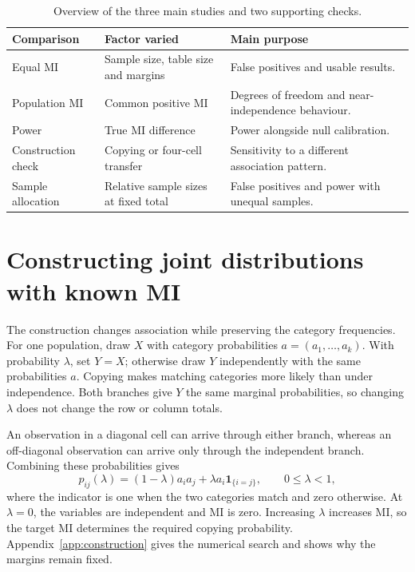 \begin{table}[H]
\centering
\caption{Overview of the three main studies and two supporting checks.}
\label{tab:design-families}
\begin{tabularx}{\textwidth}{@{}l>{\raggedright\arraybackslash}X>{\raggedright\arraybackslash}X@{}}
\toprule
Comparison & Factor varied & Main purpose\\
\midrule
Equal MI & Sample size, table size and margins & False positives and usable results.\\
Population MI & Common positive MI & Degrees of freedom and near-independence behaviour.\\
Power & True MI difference & Power alongside null calibration.\\
\midrule
Construction check & Copying or four-cell transfer & Sensitivity to a different association pattern.\\
Sample allocation & Relative sample sizes at fixed total & False positives and power with unequal samples.\\
\bottomrule
\end{tabularx}
\end{table}

\section{Constructing joint distributions with known MI}

The construction changes association while preserving the category
frequencies. For one population, draw \(X\) with category probabilities
\(a=(a_1,\ldots,a_k)\). With probability \(\lambda\), set \(Y=X\);
otherwise draw \(Y\) independently with the same probabilities \(a\).
Copying makes matching categories more likely than under independence.
Both branches give \(Y\) the same marginal probabilities, so changing
\(\lambda\) does not change the row or column totals.

An observation in a diagonal cell can arrive through either branch,
whereas an off-diagonal observation can arrive only through the
independent branch.
Combining these probabilities gives
\begin{equation}
 p_{ij}(\lambda)=(1-\lambda)a_i a_j
                  +\lambda a_i\mathbf{1}_{\{i=j\}},
 \qquad 0\leq\lambda<1,
 \label{eq:copying-construction}
\end{equation}
where the indicator is one when the two categories match and zero otherwise.
At \(\lambda=0\), the variables are independent and MI is zero.
Increasing \(\lambda\) increases MI, so the target MI determines the required
copying probability. Appendix~\ref{app:construction} gives the numerical
search and shows why the margins remain fixed.

